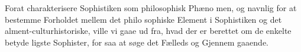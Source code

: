 \documentclass[12pt,a4paper]{book}
\begin{document}
Forat charakterisere Sophistiken som philosophisk Phæno\-%
men, og navnlig for at bestemme Forholdet mellem det philo\-%
sophiske Element i Sophistiken og det alment-culturhistoriske,
ville vi gaae ud fra, hvad der er berettet om de enkelte betyde\-%
%
%
%
%
%
%
ligste Sophister, for saa at søge det Fælleds og Gjennem\-%
gaaende.
\end{document}
